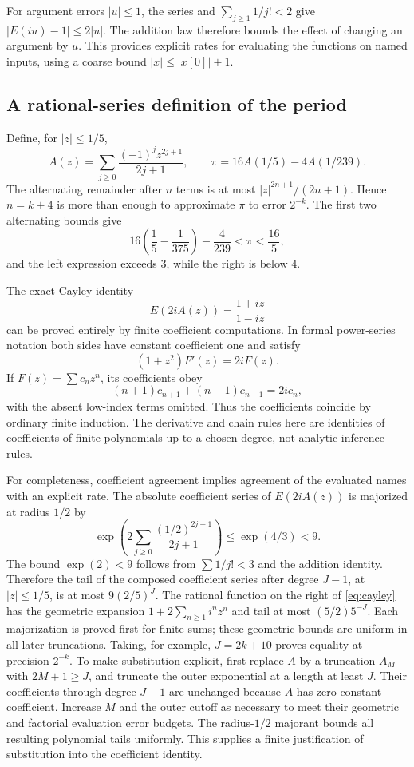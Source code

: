 \documentclass[11pt]{article}
\theoremstyle{definition}\newtheorem{definition}[theorem]{Definition}
\theoremstyle{remark}\newtheorem{remark}[theorem]{Remark}
\begin{document}
For argument errors $|u|\le1$, the series and $\sum_{j\ge1}1/j!<2$ give $|E(iu)-1|\le2|u|$. The addition law therefore bounds the effect of changing an argument by $u$. This provides explicit rates for evaluating the functions on named inputs, using a coarse bound $|x|\le|x[0]|+1$.

\subsection{A rational-series definition of the period}

Define, for $|z|\le1/5$,
\[
 A(z)=\sum_{j\ge0}\frac{(-1)^jz^{2j+1}}{2j+1},\qquad
 \pi=16A(1/5)-4A(1/239).
\]
The alternating remainder after $n$ terms is at most $|z|^{2n+1}/(2n+1)$. Hence $n=k+4$ is more than enough to approximate $\pi$ to error $2^{-k}$. The first two alternating bounds give
\[
 16\left(\frac15-\frac1{375}\right)-\frac4{239}<\pi<\frac{16}5,
\]
and the left expression exceeds $3$, while the right is below $4$.

The exact Cayley identity
\begin{equation}\label{eq:cayley}
 E(2iA(z))=\frac{1+iz}{1-iz}
\end{equation}
can be proved entirely by finite coefficient computations. In formal power-series notation both sides have constant coefficient one and satisfy
\[
 (1+z^2)F'(z)=2iF(z).
\]
If $F(z)=\sum c_nz^n$, its coefficients obey
\[
 (n+1)c_{n+1}+(n-1)c_{n-1}=2ic_n,
\]
with the absent low-index terms omitted. Thus the coefficients coincide by ordinary finite induction. The derivative and chain rules here are identities of coefficients of finite polynomials up to a chosen degree, not analytic inference rules.

For completeness, coefficient agreement implies agreement of the evaluated names with an explicit rate. The absolute coefficient series of $E(2iA(z))$ is majorized at radius $1/2$ by
\[
 \exp\left(2\sum_{j\ge0}\frac{(1/2)^{2j+1}}{2j+1}\right)
 \le\exp(4/3)<9.
\]
The bound $\exp(2)<9$ follows from $\sum1/j!<3$ and the addition identity. Therefore the tail of the composed coefficient series after degree $J-1$, at $|z|\le1/5$, is at most $9(2/5)^J$. The rational function on the right of \eqref{eq:cayley} has the geometric expansion $1+2\sum_{n\ge1}i^nz^n$ and tail at most $(5/2)5^{-J}$. Each majorization is proved first for finite sums; these geometric bounds are uniform in all later truncations. Taking, for example, $J=2k+10$ proves equality at precision $2^{-k}$. To make substitution explicit, first replace $A$ by a truncation $A_M$ with $2M+1\ge J$, and truncate the outer exponential at a length at least $J$. Their coefficients through degree $J-1$ are unchanged because $A$ has zero constant coefficient. Increase $M$ and the outer cutoff as necessary to meet their geometric and factorial evaluation error budgets. The radius-$1/2$ majorant bounds all resulting polynomial tails uniformly. This supplies a finite justification of substitution into the coefficient identity.
\end{document}
